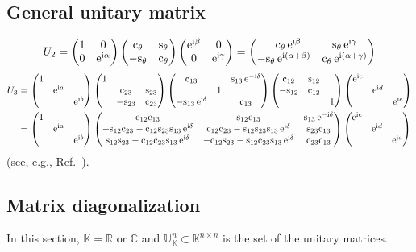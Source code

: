 \documentclass[CheatSheet]{subfiles}
\begin{document}
\subsection{General unitary matrix}
\begin{equation}
 U_2 =
\begin{pmatrix}1&0\\0&\mathop{}\!\mathrm{e}^{\mathrm{i}\alpha}\end{pmatrix}\begin{pmatrix}\mathrm{c}_{\theta}&\mathrm{s}_{\theta}\\-\mathrm{s}_{\theta}&\mathrm{c}_{\theta}\end{pmatrix}\begin{pmatrix}\mathop{}\!\mathrm{e}^{\mathrm{i}\beta}&0\\0&\mathop{}\!\mathrm{e}^{\mathrm{i}\gamma}\end{pmatrix}
=
\begin{pmatrix}\phantom{-}
\mathrm{c}_{\theta}\mathop{}\!\mathrm{e}^{\mathrm{i}\beta} & \mathrm{s}_{\theta}\mathop{}\!\mathrm{e}^{\mathrm{i}\gamma}\\
-\mathrm{s}_{\theta}\mathop{}\!\mathrm{e}^{\mathrm{i}(\alpha+\beta)} & \mathrm{c}_{\theta}\mathop{}\!\mathrm{e}^{\mathrm{i}(\alpha+\gamma)}
\end{pmatrix}
\end{equation}
\begin{align}
 U_3 &=
\pmat{1&&\\&\ee^{\ii a}&\\&&\ee^{\ii b}}
 \pmat{1&&\\&\co{23}&\si{23}\\&-\si{23}&\co{23}}
 \pmat{\co{13}&&\si{13}\ee^{-\ii\delta}\\&1&\\-\si{13}\ee^{\ii\delta}&&\co{13}}
 \pmat{\co{12}&\si{12}&\\-\si{12}&\co{12}&\\&&1}
\pmat{\ee^{\ii c}&&\\&\ee^{\ii d}&\\&&\ee^{\ii e}}
\\&=
\pmat{1&&\\&\ee^{\ii a}&\\&&\ee^{\ii b}}
 \pmat{
 \co{12} \co{13} & \si{12} \co{13} & \si{13} \ee^{-\ii\delta}\\
 -\si{12} \co{23} - \co{12} \si{23} \si{13} \ee^{\ii\delta}& \co{12} \co{23} - \si{12}\si{23}\si{13} \ee^{\ii\delta}& \si{23}\co{13}\\
  \si{12}\si{23} - \co{12} \co{23} \si{13}\ee^{\ii\delta} & -\co{12}\si{23}-\si{12}\co{23}\si{13}\ee^{\ii\delta} & \co{23} \co{13}}
\pmat{\ee^{\ii c}&&\\&\ee^{\ii d}&\\&&\ee^{\ii e}}
\end{align}
(see, e.g., Ref.~\cite{Rasin:1997pn}).

\subsection{Matrix diagonalization}\label{app:diagonalization}
In this section, $\mathbb K=\mathbb{R}$ or $\mathbb{C}$ and $\mathbb U_{\mathbb K}^{n}\subset \mathbb K^{n\times n}$ is the set of the unitary matrices.
\end{document}
